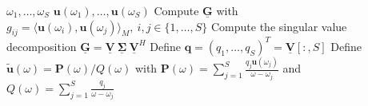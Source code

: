 \begin{algorithmic}
    \Require $\omega_1, \dots, \omega_S$ 
    \Require $\mathbf{u}(\omega_1), \dots, \mathbf{u}(\omega_S)$ 
    \State Compute $\mathbf{\underline{G}}$ with $g_{ij} = \langle \mathbf{u}(\omega_i), \mathbf{u}(\omega_j)\rangle_M,~ i, j \in \{1, \dots, S \}$ 
    \State Compute the singular value decomposition $\mathbf{\underline{G}} = \mathbf{\underline{V}}~\boldsymbol{\underline{\Sigma}}~\mathbf{\underline{V}}^H$
    \State Define $\mathbf{q} = (q_1, \dots, q_S)^T = \mathbf{\underline{V}}[:, S]$
    \State Define $\mathbf{\tilde{u}}(\omega) = \mathbf{P}(\omega) / Q(\omega)$ with $\mathbf{P}(\omega) = \sum_{j=1}^S \frac{q_j \mathbf{u}(\omega_j)}{\omega - \omega_j}$ and $Q(\omega) = \sum_{j=1}^S \frac{q_j}{\omega - \omega_j}$
\end{algorithmic}